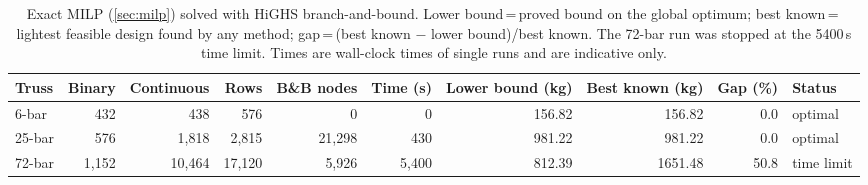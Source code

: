 \begin{table}[tbp]
\centering\footnotesize\setlength{\tabcolsep}{4pt}
\caption{Exact MILP (\cref{sec:milp}) solved with HiGHS branch-and-bound.
Lower bound\,=\,proved bound on the global optimum; best known\,=\,lightest feasible design
found by any method; gap\,=\,(best known $-$ lower bound)/best known.
The 72-bar run was stopped at the 5400\,s time limit. Times are wall-clock times of single runs
and are indicative only.}
\label{tab:milp}
\begin{tabular}{@{}lrrrrrrrrl@{}}
\toprule
Truss & Binary & Continuous & Rows & B\&B nodes & Time (s) & Lower bound (kg) & Best known (kg) & Gap (\%) & Status\\
\midrule
6-bar & 432 & 438 & 576 & 0 & 0 & 156.82 & 156.82 & 0.0 & optimal\\
25-bar & 576 & 1,818 & 2,815 & 21,298 & 430 & 981.22 & 981.22 & 0.0 & optimal\\
72-bar & 1,152 & 10,464 & 17,120 & 5,926 & 5,400 & 812.39 & 1651.48 & 50.8 & time limit\\
\bottomrule
\end{tabular}
\end{table}
